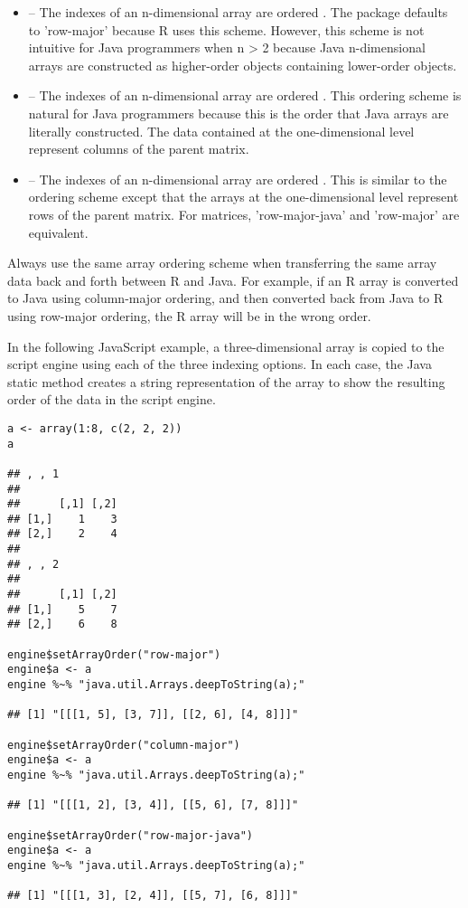 \begin{itemize}
\item {} -- The indexes of an n-dimensional array are ordered \newline{}. The  package defaults to 'row-major' because R uses this scheme. However, this scheme is not intuitive for Java programmers when n > 2 because Java n-dimensional arrays are constructed as higher-order objects containing lower-order objects.

\item {} -- The indexes of an n-dimensional array are ordered \newline{}. This ordering scheme is natural for Java programmers because this is the order that Java arrays are literally constructed. The data contained at the one-dimensional level represent columns of the parent matrix.

\item {} -- The indexes of an n-dimensional array are ordered \newline{}. This is similar to the  ordering scheme except that the arrays at the one-dimensional level represent rows of the parent matrix. For matrices, 'row-major-java' and 'row-major' are equivalent.

\end{itemize}

 Always use the same array ordering scheme when transferring the same array data back and forth between R and Java. For example, if an R array is converted to Java using column-major ordering, and then converted back from Java to R using row-major ordering, the R array will be in the wrong order.

In the following JavaScript example, a three-dimensional array is copied to the script engine using each of the three indexing options. In each case, the Java static method  creates a string representation of the array to show the resulting order of the data in the script engine.

\begin{verbatim}
a <- array(1:8, c(2, 2, 2))
a

## , , 1
## 
##      [,1] [,2]
## [1,]    1    3
## [2,]    2    4
## 
## , , 2
## 
##      [,1] [,2]
## [1,]    5    7
## [2,]    6    8

engine$setArrayOrder("row-major")
engine$a <- a
engine %~% "java.util.Arrays.deepToString(a);"

## [1] "[[[1, 5], [3, 7]], [[2, 6], [4, 8]]]"

engine$setArrayOrder("column-major")
engine$a <- a
engine %~% "java.util.Arrays.deepToString(a);"

## [1] "[[[1, 2], [3, 4]], [[5, 6], [7, 8]]]"

engine$setArrayOrder("row-major-java")
engine$a <- a
engine %~% "java.util.Arrays.deepToString(a);"

## [1] "[[[1, 3], [2, 4]], [[5, 7], [6, 8]]]"
\end{verbatim}

